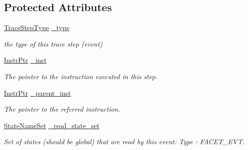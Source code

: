 \subsection*{Protected Attributes}
\begin{DoxyCompactItemize}
\item 
\mbox{\label{classilang_1_1_trace_step_a73261de8f31c1a25ca303e9fe5b50eb4}} 
\mbox{\hyperlink{classilang_1_1_trace_step_af2fb22e1a0aeacee818188a3e14c46dd}{Trace\+Step\+Type}} \mbox{\hyperlink{classilang_1_1_trace_step_a73261de8f31c1a25ca303e9fe5b50eb4}{\+\_\+type}}
\begin{DoxyCompactList}\small\item\em the type of this trace step (event) \end{DoxyCompactList}\item 
\mbox{\label{classilang_1_1_trace_step_a7800d9ce7ad73703bb4c1a7b30f2a892}} 
\mbox{\hyperlink{namespaceilang_af88a19312ae653d687a0d1207bb284f6}{Instr\+Ptr}} \mbox{\hyperlink{classilang_1_1_trace_step_a7800d9ce7ad73703bb4c1a7b30f2a892}{\+\_\+inst}}
\begin{DoxyCompactList}\small\item\em The pointer to the instruction executed in this step. \end{DoxyCompactList}\item 
\mbox{\label{classilang_1_1_trace_step_acebe873df838b548513bcc9651ed1fb2}} 
\mbox{\hyperlink{namespaceilang_af88a19312ae653d687a0d1207bb284f6}{Instr\+Ptr}} \mbox{\hyperlink{classilang_1_1_trace_step_acebe873df838b548513bcc9651ed1fb2}{\+\_\+parent\+\_\+inst}}
\begin{DoxyCompactList}\small\item\em The pointer to the referred instruction. \end{DoxyCompactList}\item 
\mbox{\label{classilang_1_1_trace_step_a15793cd927d72b7631f9a7be52fed8b8}} 
\mbox{\hyperlink{classilang_1_1_trace_step_a784c4a30b16707ec6a2ed6e96e268c86}{State\+Name\+Set}} \mbox{\hyperlink{classilang_1_1_trace_step_a15793cd927d72b7631f9a7be52fed8b8}{\+\_\+read\+\_\+state\+\_\+set}}
\begin{DoxyCompactList}\small\item\em Set of states (should be global) that are read by this event\+: Type \+: F\+A\+C\+E\+T\+\_\+\+E\+VT. \end{DoxyCompactList}\item 

\end{DoxyCompactItemize}
